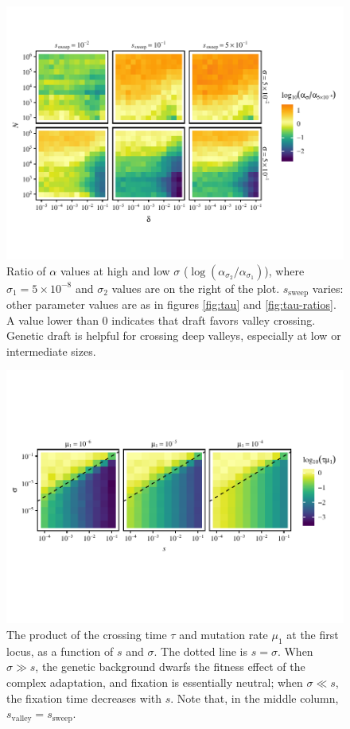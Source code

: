 \documentclass[10pt,twocolumn,twoside]{gsajnl}
\begin{document}
\begin{spacing}{1.5}
\begin{figure}[t]
  \includegraphics[width=\textwidth]{Figures/log_ratio_s0-1.pdf}
\caption{Ratio of $\alpha$ values at high and low $\sigma$ ($\log \left( \alpha_{\sigma_2} / \alpha_{\sigma_1} \right)$), where $\sigma_1=5 \times 10^{-8}$ and $\sigma_2$ values are on the right of the plot. $s_{\mathrm{sweep}}$ varies: other parameter values are as in figures \ref{fig:tau} and \ref{fig:tau-ratios}. A value lower than $0$ indicates that draft favors valley crossing. Genetic draft is helpful for crossing deep valleys, especially at low or intermediate sizes.}
\label{fig:alpha-ratios}
\end{figure}


\begin{figure}[t]
\includegraphics[width=\textwidth]{Figures/log_taumu.pdf}
\caption{The product of the crossing time $\tau$ and mutation rate $\mu_1$ at the first locus, as a function of $s$ and $\sigma$. The dotted line is $s = \sigma$. When $\sigma \gg s$, the genetic background dwarfs the fitness effect of the complex adaptation, and fixation is essentially neutral; when $\sigma \ll s$, the fixation time decreases with $s$. Note that, in the middle column, $s_{\mathrm{valley}} = s_{\mathrm{sweep}}$.}
\label{fig:tau-mu}
\end{figure}


\end{spacing}
\end{document}
